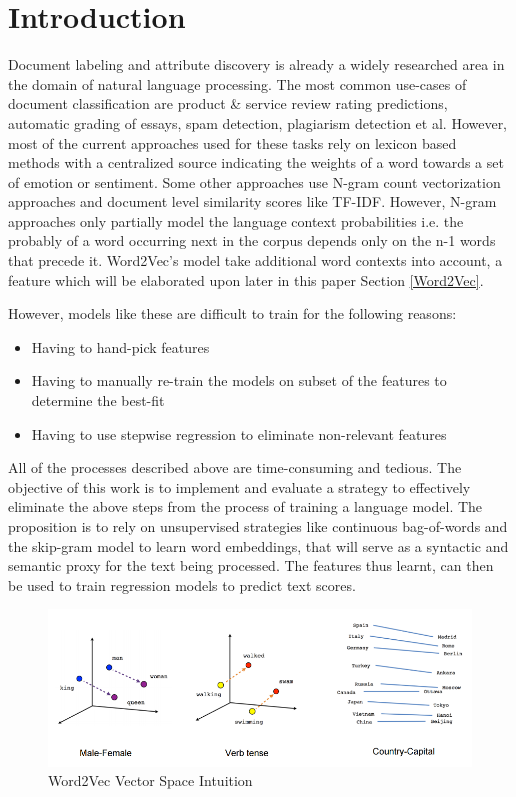 \documentclass[conference]{IEEEtran}
\begin{document}
\section{Introduction}
    Document labeling and attribute discovery is already a widely researched area in the domain of natural language processing.
    The most common use-cases of document classification are product \& service review rating predictions, automatic grading of essays, spam detection, plagiarism detection et al.
    However, most of the current approaches used for these tasks rely on lexicon based methods with a centralized source indicating the weights of a word towards a set of emotion or sentiment.
    Some other approaches use N-gram count vectorization approaches and document level similarity scores like TF-IDF.
    However, N-gram approaches only partially model the language context probabilities i.e. the probably of a word occurring next in the corpus depends only on the n-1 words that precede it.
    Word2Vec's model take additional word contexts into account, a feature which will be elaborated upon later in this paper Section \ref{Word2Vec}.

    However, models like these are difficult to train for the following reasons:
    \begin{itemize}
      \item Having to hand-pick features
      \item Having to manually re-train the models on subset of the features to determine the best-fit
      \item Having to use stepwise regression to eliminate non-relevant features
    \end{itemize}

    All of the processes described above are time-consuming and tedious. 
    The objective of this work is to implement and evaluate a strategy to effectively eliminate the above steps from the process of training a language model. 
    The proposition is to rely on unsupervised strategies like continuous bag-of-words and the skip-gram model to learn word embeddings, that will serve as a syntactic and semantic proxy for the text being processed. 
    The features thus learnt, can then be used to train regression models to predict text scores.

\begin{figure}[ht] \label{fig:word2vec-vectorspace-intuition}
    \centering
    \includegraphics[width=\textwidth]{images/word2vec_1.png}
    \caption{Word2Vec Vector Space Intuition\cite{tensorflow_word2vec}}
\end{figure}
\end{document}
